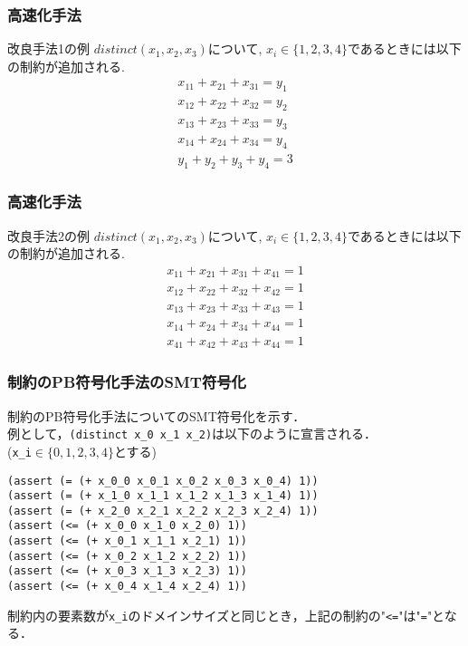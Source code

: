 \begin{frame}
    \frametitle{高速化手法}
    \vspace{-3mm}
    \begin{exampleblock}{改良手法1の例}
        $distinct(x_1, x_2, x_3)$について, $x_i \in \{1, 2, 3, 4\}$であるときには以下の制約が追加される.
        \vspace{-3mm}
        \begin{eqnarray*}
            x_{11}+x_{21}+x_{31}=y_1\\
            x_{12}+x_{22}+x_{32}=y_2\\
            x_{13}+x_{23}+x_{33}=y_3\\
            x_{14}+x_{24}+x_{34}=y_4\\
            y_1+y_2+y_3+y_4=3
        \end{eqnarray*}
    \end{exampleblock}
\end{frame}
\begin{frame}
    \frametitle{高速化手法}
    \vspace{-3mm}
    \begin{exampleblock}{改良手法2の例}
        $distinct(x_1, x_2, x_3)$について, $x_i \in \{1, 2, 3, 4\}$であるときには以下の制約が追加される.
        \vspace{-3mm}
        \begin{eqnarray*}
            x_{11}+x_{21}+x_{31}+x_{41}=1\\
            x_{12}+x_{22}+x_{32}+x_{42}=1\\
            x_{13}+x_{23}+x_{33}+x_{43}=1\\
            x_{14}+x_{24}+x_{34}+x_{44}=1\\
            x_{41}+x_{42}+x_{43}+x_{44}=1
        \end{eqnarray*}

    \end{exampleblock}
\end{frame}
\begin{frame}[fragile]
    \frametitle{\distinct 制約のPB符号化手法のSMT符号化}
    \distinct 制約のPB符号化手法についてのSMT符号化を示す．\\
    例として，\verb|(distinct x_0 x_1 x_2)|は以下のように宣言される．\\
    (\verb|x_i|$\in \{0,1,2,3,4\}$とする)
    \begin{exampleblock}{}\scriptsize
\begin{verbatim}
(assert (= (+ x_0_0 x_0_1 x_0_2 x_0_3 x_0_4) 1))
(assert (= (+ x_1_0 x_1_1 x_1_2 x_1_3 x_1_4) 1))
(assert (= (+ x_2_0 x_2_1 x_2_2 x_2_3 x_2_4) 1))
(assert (<= (+ x_0_0 x_1_0 x_2_0) 1))
(assert (<= (+ x_0_1 x_1_1 x_2_1) 1))
(assert (<= (+ x_0_2 x_1_2 x_2_2) 1))
(assert (<= (+ x_0_3 x_1_3 x_2_3) 1))
(assert (<= (+ x_0_4 x_1_4 x_2_4) 1))
\end{verbatim}
    \end{exampleblock}
    \distinct 制約内の要素数が\verb|x_i|のドメインサイズと同じとき，上記の制約の"\verb|<=|"は"\verb|=|"となる．
\end{frame}



